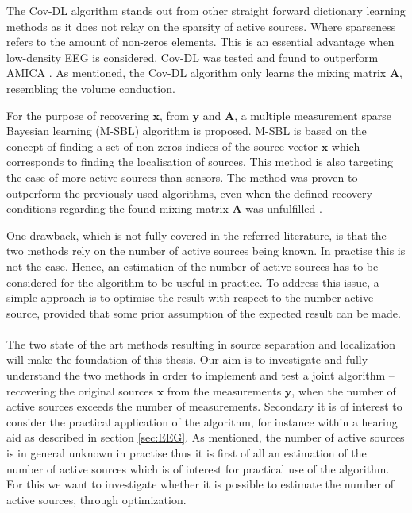 The Cov-DL algorithm stands out from other straight forward dictionary learning methods as it does not relay on the sparsity of active sources. Where sparseness refers to the amount of non-zeros elements. This is an essential advantage when low-density EEG is considered. 
Cov-DL was tested and found to outperform AMICA \cite{Balkan2015}.  
As mentioned, the Cov-DL algorithm only learns the mixing matrix $\mathbf{A}$, resembling the volume conduction.

 For the purpose of recovering $\mathbf{x}$, from $\mathbf{y}$ and $\mathbf{A}$, a multiple measurement sparse Bayesian learning (M-SBL) algorithm is proposed. M-SBL is based on the concept of finding a set of non-zeros indices of the source vector $\mathbf{x}$ which corresponds to finding the localisation of sources. This method is also targeting the case of more active sources than sensors.
The method was proven to outperform the previously used algorithms, even when the defined recovery conditions regarding the found mixing matrix $\mathbf{A}$ was unfulfilled \cite{Balkan2014}.

One drawback, which is not fully covered in the referred literature, is that the two methods rely on the number of active sources being known. 
In practise this is not the case. 
Hence, an estimation of the number of active sources has to be considered for the algorithm to be useful in practice. To address this issue, a simple approach is to optimise the result with respect to the number active source, provided that some prior assumption of the expected result can be made. 
\\ \\
The two state of the art methods resulting in source separation and localization will make the foundation of this thesis. 
Our aim is to investigate and fully understand the two methods in order to implement and test a joint algorithm -- recovering the original sources $\mathbf{x}$ from the measurements $\mathbf{y}$, when the number of active sources exceeds the number of measurements. 
Secondary it is of interest to consider the practical application of the algorithm, for instance within a hearing aid as described in section \ref{sec:EEG}. 
As mentioned, the number of active sources is in general unknown in practise thus it is first of all an estimation of the number of active sources which is of interest for practical use of the algorithm. 
For this we want to investigate whether it is possible to estimate the number of active sources, through optimization. 



